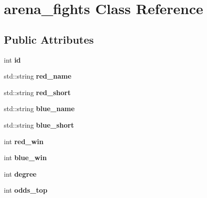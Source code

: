 \hypertarget{classarena__fights}{\section{arena\-\_\-fights Class Reference}
\label{classarena__fights}
}
\subsection*{Public Attributes}
\begin{DoxyCompactItemize}
\item 
\hypertarget{classarena__fights_a7e1f42a6431003fb2f852eb6fb5e6afe}{int {\bfseries id}}\label{classarena__fights_a7e1f42a6431003fb2f852eb6fb5e6afe}

\item 
\hypertarget{classarena__fights_ad205541a2a692c35f64252d3d2b592a2}{std\-::string {\bfseries red\-\_\-name}}\label{classarena__fights_ad205541a2a692c35f64252d3d2b592a2}

\item 
\hypertarget{classarena__fights_adcca352c69a0254d8c0274481e399ff9}{std\-::string {\bfseries red\-\_\-short}}\label{classarena__fights_adcca352c69a0254d8c0274481e399ff9}

\item 
\hypertarget{classarena__fights_aecb4273fe2600cafccc859ed4d307af3}{std\-::string {\bfseries blue\-\_\-name}}\label{classarena__fights_aecb4273fe2600cafccc859ed4d307af3}

\item 
\hypertarget{classarena__fights_aa6f4b7b06ccdc44a7b8e4a41603e61f1}{std\-::string {\bfseries blue\-\_\-short}}\label{classarena__fights_aa6f4b7b06ccdc44a7b8e4a41603e61f1}

\item 
\hypertarget{classarena__fights_a53884e23f0284d73161487c68ded427f}{int {\bfseries red\-\_\-win}}\label{classarena__fights_a53884e23f0284d73161487c68ded427f}

\item 
\hypertarget{classarena__fights_a7855849929c3cebb5e3c9f43965e9cb4}{int {\bfseries blue\-\_\-win}}\label{classarena__fights_a7855849929c3cebb5e3c9f43965e9cb4}

\item 
\hypertarget{classarena__fights_aa6db7e4d59b263d32c3fff2b8027a6f8}{int {\bfseries degree}}\label{classarena__fights_aa6db7e4d59b263d32c3fff2b8027a6f8}

\item 
\hypertarget{classarena__fights_a6f6ab9a7a094df07da794ea7509a3889}{int {\bfseries odds\-\_\-top}}\label{classarena__fights_a6f6ab9a7a094df07da794ea7509a3889}


\end{DoxyCompactItemize}
